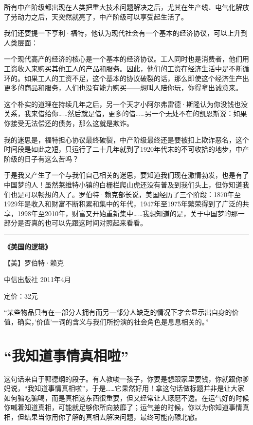 所有中产阶级都出现在人类把重大技术问题解决之后，尤其在生产线、电气化解放了劳动力之后，天突然就亮了，中产阶级可以享受起生活了。

我们还要提一下亨利·福特，他认为现代社会有一个基本的经济协议，可以上升到人类层面：

一个现代高产的经济的核心是一个基本的经济协议。工人同时也是消费者，他们用工资收入来购买其他工人的产品和服务。因此，他们的工资在经济生活中是不断循环的。如果工人的工资不足，这个基本的协议破裂的话，那么即使这个经济生产出更多的商品和服务，人们也没有能力购买------想叫人陪你玩，你得拿出诚意来。

这个朴实的道理在持续几年之后，另一个天才小阿尔弗雷德·斯隆认为你没钱也没关系，我来借给你\ldots\ldots 然后就是借，更多的借\ldots\ldots 另一个无处不在的凯恩斯说：如果你接受无法偿还的债务，那么这就是欺诈。

我的迷思是，福特担心协议最终破裂，中产阶级最终还是要被扣上欺诈恶名，这个时间段是如此之短，只运行了二十几年就到了1920年代末的不可收拾的地步，中产阶级的日子有这么苦吗？

于是我又产生了一个与我们自己相关的迷思，要知道我们现在激情勃发，也是有了中国梦的人！虽然莱维特小镇的白栅栏爬山虎还没有普及到我们头上，但你知道我们也是可以畅想的人了。罗伯特·赖克部长说，美国经历了三个阶段：1870年至1929年是收入和财富不断积累和集中的年代，1947年至1975年繁荣得到了广泛的共享，1998年至2010年，财富又开始重新集中\ldots\ldots 我想知道的是，关于中国梦的那一部分是否真的也可以先跟这时间对照起来看看。

\begin{center}\rule{0.5\linewidth}{0.5pt}\end{center}

\textbf{《美国的逻辑》}

【美】罗伯特·赖克

中信出版社 2011年4月

定价：32元

``某些物品只有在一部分人拥有而另一部分人缺乏的情况下才会显示出自身的价值，确实，'价值'一词的含义与我们所扮演的社会角色是息息相关的。''

\hypertarget{ux6211ux77e5ux9053ux4e8bux60c5ux771fux76f8ux5566}{%
\section{``我知道事情真相啦''}\label{ux6211ux77e5ux9053ux4e8bux60c5ux771fux76f8ux5566}}

这句话来自于郭德纲的段子。有人教唆一孩子，你要是想跟家里要钱，你就跟你爹妈说，``我知道事情真相啦''，于是\ldots\ldots 它果然好用！拿这句话做标题并非是让大家如何骗吃骗喝，而是真相这东西很重要，但又经常让人琢磨不透。在运气好的时候你喊着知道真相，可能就足够你所向披靡了；运气差的时候，你以为你知道事情真相，但结果当你用你了解的真相去解决问题，最终可能南辕北辙。

